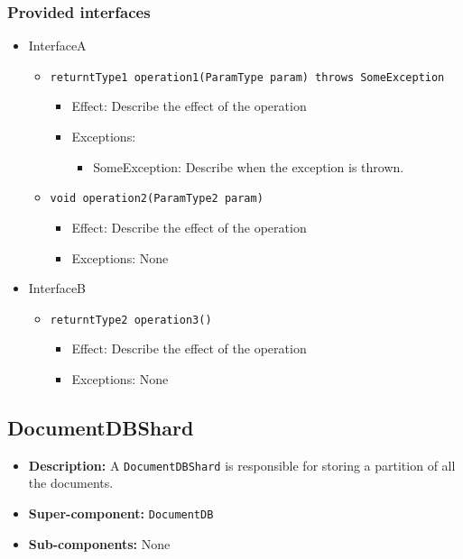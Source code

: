 \documentclass[a4paper,10pt]{article}
\begin{document}
\subsubsection*{Provided interfaces}
\begin{itemize}
    \item InterfaceA
    \begin{itemize}
        \item \texttt{returntType1 operation1(ParamType param) throws SomeException}
        \begin{itemize}
            \item Effect: Describe the effect of the operation
            \item Exceptions:
            \begin{itemize}
                \item SomeException: Describe when the exception is thrown.
            \end{itemize}
		\end{itemize}
        \item \texttt{void operation2(ParamType2 param)}
        \begin{itemize}
             \item Effect: Describe the effect of the operation
             \item Exceptions: None
        \end{itemize} 
    \end{itemize}

    \item InterfaceB
    \begin{itemize}
        \item \texttt{returntType2 operation3()}
        \begin{itemize}
            \item Effect: Describe the effect of the operation
            \item Exceptions: None
        \end{itemize}
    \end{itemize}
\end{itemize}

\subsection{DocumentDBShard}
\begin{itemize}
    \item \textbf{Description:} A \texttt{DocumentDBShard} is responsible for storing a partition of all the documents.
    \item \textbf{Super-component:} \texttt{DocumentDB}
    \item \textbf{Sub-components:} None
\end{itemize}
\end{document}
